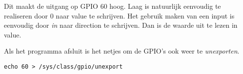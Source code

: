 Dit maakt de uitgang op GPIO 60 hoog. Laag is natuurlijk eenvoudig te realiseren
door 0 naar value te schrijven.
Het gebruik maken van een input is eenvoudig door \emph{in} naar direction te schrijven.
Dan is de waarde uit te lezen in value.

Als het programma afsluit is het netjes om de GPIO's ook weer te \emph{unexporten}.

\begin{verbatim}
echo 60 > /sys/class/gpio/unexport
\end{verbatim}

